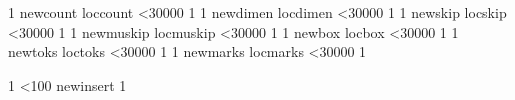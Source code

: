 
\def\checkregister#1{%
  \edef\newregister{\expandafter\noexpand\csname new#1\endcsname}%
  \edef\locregister{\expandafter\noexpand\csname loc#1\endcsname}%
  \count0 1
  \loop
    \newregister\dummy
    \locregister\dummy
  \ifnum\count0<30000
    \advance{} 1
  \repeat}
\checkregister{count}
\checkregister{dimen}
\checkregister{skip}
\checkregister{muskip}
\checkregister{box}
\checkregister{toks}
\checkregister{marks}

 1
\loop \ifnum{}<100
  \csname newinsert\endcsname\dummy
  \advance{} 1
\repeat

\globcountblk {}
\globdimenblk {}
\globskipblk  {}
\globmuskipblk{}
\globboxblk   {}
\globtoksblk  {}
\globmarksblk {}

\loccountblk  {}
\locdimenblk  {}
\locskipblk   {}
\locmuskipblk {}
\locboxblk    {}
\loctoksblk   {}
\locmarksblk  {}
\bye
\endinput
